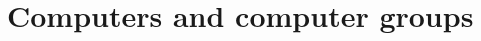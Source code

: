 \documentclass[../main.tex]{subfiles}
\begin{document}
\section{Computers and computer groups}
\end{document}
